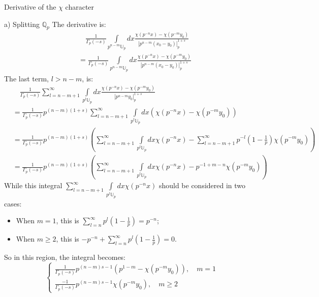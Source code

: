 \documentclass[12pt]{article}
\begin{document}
\begin{section}{Derivative of the $\chi$ character}
\begin{paragraph}{a) Splitting $\mathbb{Q}_p$}
The derivative is:
\begin{equation}
\begin{split}
&\quad\frac{1}{\Gamma_p (-s)} \int\limits _{p^{n-m}\mathbb{U}_p}dx\frac{\chi( p^{-n} x) - \chi( p^{-m}y_0)}{|p^{n-m}(x_0-y_0)|_p^{1+s}}\\
&=\frac{1}{\Gamma_p (-s)} \int\limits _{p^{n-m}\mathbb{U}_p}dx\frac{\chi( p^{-n} x) - \chi( p^{-m}y_0)}{|p^{n-m}(x_0-y_0)|_p^{1+s}}
\end{split}
\end{equation}
The last term, $l>n-m$, is:
\begin{equation}
\begin{split}
&\quad\frac{1}{\Gamma_p (-s)} \sum_{l=n-m+1}^{\infty} \int\limits _{p^l \mathbb{U}_p}dx\frac{\chi( p^{-n} x) - \chi( p^{-m}y_0)}{|p^{n-m}y_0|_p^{1+s}}\\
&=\frac{1}{\Gamma_p (-s)} p^{(n-m)(1+s)} \sum_{l=n-m+1}^{\infty} \int\limits _{p^l \mathbb{U}_p}dx (\chi( p^{-n} x) - \chi( p^{-m}y_0))\\
&=\frac{1}{\Gamma_p (-s)} p^{(n-m)(1+s)} (\sum_{l=n-m+1}^{\infty} \int\limits _{p^l \mathbb{U}_p}dx \chi( p^{-n} x) - \sum_{l=n-m+1}^{\infty} p^{-l}(1-\frac{1}{p})\chi( p^{-m}y_0))\\
&=\frac{1}{\Gamma_p (-s)} p^{(n-m)(1+s)} (\sum_{l=n-m+1}^{\infty} \int\limits _{p^l \mathbb{U}_p}dx \chi( p^{-n} x) - p^{-1+m-n}\chi( p^{-m}y_0))
\end{split}
\end{equation}
While this integral $\sum_{l=n-m+1}^{\infty}\int\limits _{p^l \mathbb{U}_p}dx \chi( p^{-n} x)$ should be considered in two cases: \\
\begin{itemize}
\item When $m=1$, this is $\sum^\infty_{l=n}p^l(1-\frac{1}{p})=p^{-n}$;
\item When $m\geq 2$, this is $-p^{-n}+\sum^\infty_{l=n}p^l(1-\frac{1}{p})=0$.
\end{itemize}
So in this region, the integral becomes:
\begin{equation}
\begin{cases}
\frac{1}{\Gamma_p (-s)} p^{(n-m)s-1} (p^{1-m} - \chi( p^{-m}y_0)), \quad m=1\\
\frac{-1}{\Gamma_p (-s)} p^{(n-m)s-1} \chi( p^{-m}y_0), \quad m\geq 2
\end{cases}
\end{equation}
\end{paragraph}

\end{section}
\end{document}
